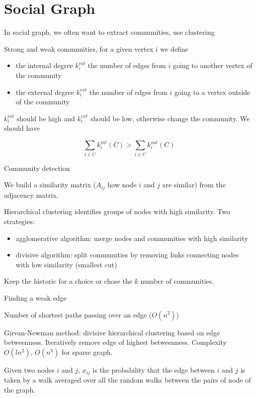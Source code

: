 
\section{Social Graph}

In social graph, we often want to extract communities, use clustering


Strong and weak communities, for a given vertex $i$ we define

\begin{itemize}
  \item the internal degree $k_i^{int}$ the number of edges from $i$ going to another vertex of the community
  \item the external degree $k_i^{ext}$ the number of edges from $i$ going to a vertex outside of the community
\end{itemize}

$k_i^{int}$ should be high and $k_i^{ext}$ should be low, otherwise change the community. We should have

\[
  \sum_{i\in C} k_i^{int}(C) > \sum_{i\in C} k_i^{out}(C)
\]

Community detection

We build a similarity matrix ($A_{ij}$ how node $i$ and $j$ are similar) from the adjacency matrix.

Hierarchical clustering identifies groups of nodes with high similarity. Two strategies:

\begin{itemize}
  \item agglomerative algorithm: merge nodes and communities with high similarity
  \item divisive algorithm: split communities by removing links connecting nodes with low similarity (smallest cut)
\end{itemize}

Keep the historic for a choice or chose the $k$ number of communities.

Finding a weak edge

\begin{definition}
  Number of shortest paths passing over an edge ($O(n^2)$)
\end{definition}

Girvan-Newman method: divisive hierarchical clustering based on edge betweenness. Iteratively remove edge of highest betweenness. Complexity $O(ln^2)$, $O(n^3)$ for sparse graph.


\begin{definition}
  Given two nodes $i$ and $j$, $x_{ij}$ is the probability that the edge between $i$ and $j$ is taken by a walk averaged over all the random walks between the pairs of node of the graph.
\end{definition}

